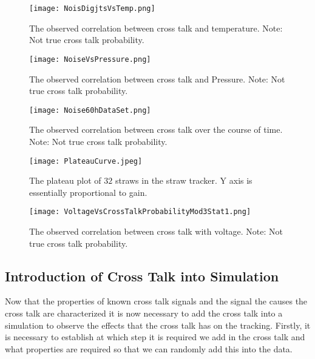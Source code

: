 \documentclass[./Thesis]{subfiles}
\begin{document}
	
	
\begin{figure}
	\centerline{\texttt{[image: NoisDigjtsVsTemp.png]}}
	\caption[ Cross Talk Vs. Temperature]{ The observed correlation between cross talk and temperature. Note: Not true cross talk probability.}
	\label{fig:NoiseTemp}
\end{figure}

\begin{figure}
	\centerline{\texttt{[image: NoiseVsPressure.png]}}
	\caption[ Cross Talk Vs. Pressure ]{ The observed correlation between cross talk and Pressure. Note: Not true cross talk probability.}
	\label{fig:NoisePress}
\end{figure}

\begin{figure}
	\centerline{\texttt{[image: Noise60hDataSet.png]}}
	\caption[ Cross Talk Vs. RunNumber ]{ The observed correlation between cross talk over the course of time. Note: Not true cross talk probability.}
	\label{fig:NoiseRun}
\end{figure}

\begin{figure}
	\centerline{\texttt{[image: PlateauCurve.jpeg]}}
	\caption[Plateau Plot  ]{ The plateau plot of $32$ straws in the straw tracker. Y axis is essentially proportional to gain.}
	\label{fig:plateau}
\end{figure}


\begin{figure}
	\centerline{\texttt{[image: VoltageVsCrossTalkProbabilityMod3Stat1.png]}}
	\caption[ Cross Talk Vs. Voltage (V)]{ The observed correlation between cross talk with voltage. Note: Not true cross talk probability.}
	\label{fig:NoiseVolts}
\end{figure}

	
	
\subsection{Introduction of Cross Talk into Simulation}

	Now that the  properties of known cross talk signals and the signal the causes the cross talk are characterized it is now necessary to add the cross talk into a simulation to observe the effects that the cross talk has on the tracking. Firstly, it is necessary to establish at which step it is required we add in the cross talk and what properties are required so that we can randomly add this into the data. 
	
\end{document}
